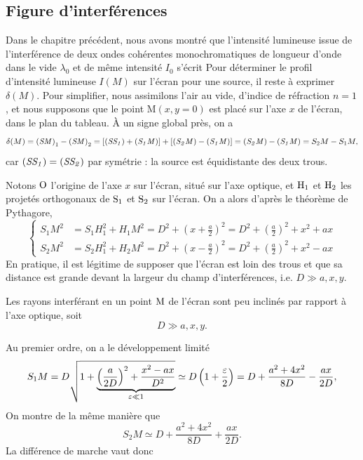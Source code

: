 \documentclass[12pt,fancy]{cours}
\begin{document}
\subsection{Figure d’interférences}\label{subsec:expression_delta}
Dans le chapitre précédent, nous avons montré que l’intensité lumineuse issue de l'interférence de deux ondes cohérentes monochromatiques de longueur d'onde dans le vide $\lambda_0$ et de même intensité $I_0$ s’écrit
Pour déterminer le profil d'intensité lumineuse $I(M)$ sur l'écran pour une source, il reste à exprimer $\delta(M)$. Pour simplifier, nous assimilons l’air au vide, d’indice de réfraction $n =1$, et nous supposons que le point M$(x,y=0)$ est placé sur l’axe $x$ de l’écran, dans le plan du tableau.
 À un signe global près, on a
\begin{equation}
\delta(M) = \mathit{(S M)}_1-\mathit{(S M)}_2 = [ \mathit{(SS_1)} +  \mathit{(S_1 M)} ] + [ \mathit{(S_2 M)} - \mathit{(S_1 M)} ] = \mathit{(S_2 M)}-\mathit{(S_1 M)} = S_2M-S_1M,
\end{equation}
car $\mathit{(SS_1)} = \mathit{(SS_2)}$ par symétrie : la source est équidistante des deux trous.

Notons $\rm O$ l'origine de l'axe $x$ sur l'écran, situé sur l'axe optique, et $\rm H_1$ et $\rm H_2$ les projetés orthogonaux de $\rm S_1$ et $\rm S_2$ sur l'écran. On a alors d'après le théorème de Pythagore,
\begin{equation}
  \begin{cases}
      S_1 M^2 & = S_1H_1^2 +H_1M^2 = D^2 + (x + \frac{a}{2})^2 = D^2 + \left(\frac{a}{2}\right)^2+x^2 +ax \\ 
      S_2 M^2 & = S_2H_1^2 +H_2M^2 = D^2 + (x - \frac{a}{2})^2 = D^2 + \left(\frac{a}{2}\right)^2+x^2-ax
  \end{cases}
  \end{equation}
En pratique, il est légitime de supposer que l'écran est loin des trous et que sa distance est grande devant la largeur du champ d’interférences, i.e. $D \gg a,x,y$.
\begin{prop}%
Les rayons interférant en un point $\rm M$ de l'écran sont peu inclinés par rapport à l’axe optique, soit
$$D \gg a,x,y.$$
\end{prop}
 Au premier ordre, on a le développement limité
\begin{equation}
S_1 M = D\sqrt{1+\underbrace{\left(\frac{a}{2D}\right)^2+\dfrac{x^2 -ax}{D^2}}_{\varepsilon \ll 1}}\simeq D\left(1 +\frac{\varepsilon}{2}\right) = D + \dfrac{a^2+4x^2}{8D}-\frac{ax}{2D},
\end{equation}
On montre de la même manière que
\begin{equation}
S_2 M\simeq D+\dfrac{a^2+4x^2}{8D}+\frac{ax}{2D}.
\end{equation}
La différence de marche vaut donc
\end{document}
